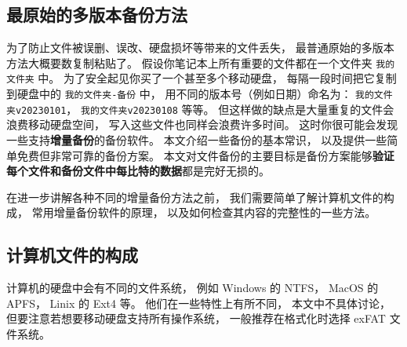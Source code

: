 
\subsection{最原始的多版本备份方法}
为了防止文件被误删、误改、硬盘损坏等带来的文件丢失， 最普通原始的多版本方法大概要数复制粘贴了。 假设你笔记本上所有重要的文件都在一个文件夹 \verb|我的文件夹| 中。 为了安全起见你买了一个甚至多个移动硬盘， 每隔一段时间把它复制到硬盘中的 \verb|我的文件夹-备份| 中， 用不同的版本号（例如日期）命名为： \verb|我的文件夹v20230101|， \verb|我的文件夹v20230108| 等等。 但这样做的缺点是大量重复的文件会浪费移动硬盘空间， 写入这些文件也同样会浪费许多时间。 这时你很可能会发现一些支持\textbf{增量备份}的备份软件。 本文介绍一些备份的基本常识， 以及提供一些简单免费但非常可靠的备份方案。 本文对文件备份的主要目标是备份方案能够\textbf{验证每个文件和备份文件中每比特的数据}都是完好无损的。

在进一步讲解各种不同的增量备份方法之前， 我们需要简单了解计算机文件的构成， 常用增量备份软件的原理， 以及如何检查其内容的完整性的一些方法。

\subsection{计算机文件的构成}
计算机的硬盘中会有不同的文件系统， 例如 Windows 的 NTFS， MacOS 的 APFS， Linix 的 Ext4 等。 他们在一些特性上有所不同， 本文中不具体讨论， 但要注意若想要移动硬盘支持所有操作系统， 一般推荐在格式化时选择 exFAT 文件系统。

